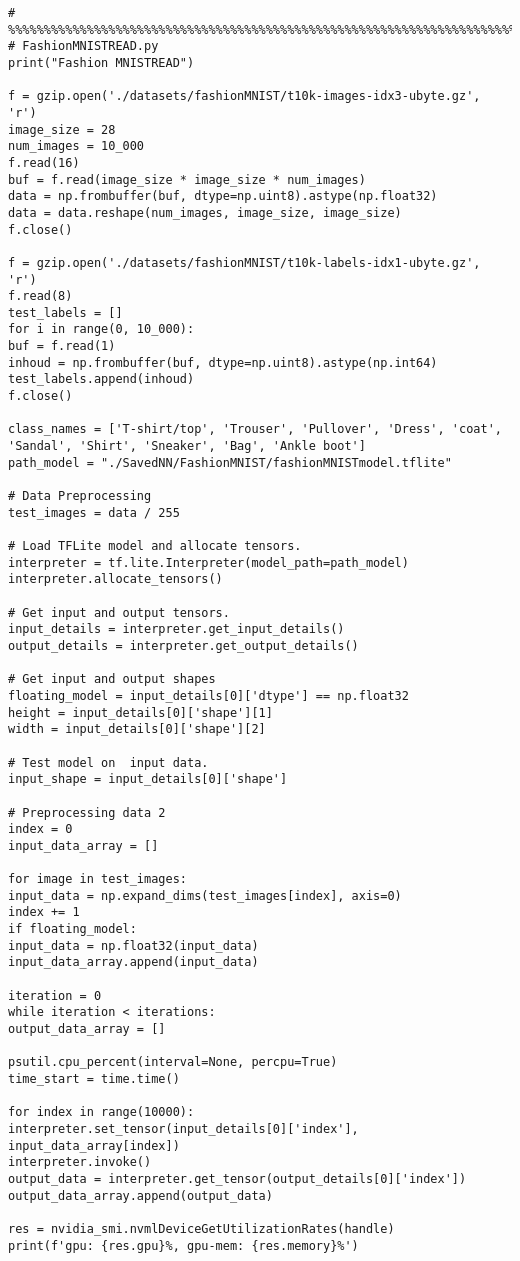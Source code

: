 \begin{lstlisting}
# %%%%%%%%%%%%%%%%%%%%%%%%%%%%%%%%%%%%%%%%%%%%%%%%%%%%%%%%%%%%%%%%%%%%%%%%%%%%%%%%%%%%%%%
# FashionMNISTREAD.py
print("Fashion MNISTREAD")

f = gzip.open('./datasets/fashionMNIST/t10k-images-idx3-ubyte.gz', 'r')
image_size = 28
num_images = 10_000
f.read(16)
buf = f.read(image_size * image_size * num_images)
data = np.frombuffer(buf, dtype=np.uint8).astype(np.float32)
data = data.reshape(num_images, image_size, image_size)
f.close()

f = gzip.open('./datasets/fashionMNIST/t10k-labels-idx1-ubyte.gz', 'r')
f.read(8)
test_labels = []
for i in range(0, 10_000):
buf = f.read(1)
inhoud = np.frombuffer(buf, dtype=np.uint8).astype(np.int64)
test_labels.append(inhoud)
f.close()

class_names = ['T-shirt/top', 'Trouser', 'Pullover', 'Dress', 'coat',
'Sandal', 'Shirt', 'Sneaker', 'Bag', 'Ankle boot']
path_model = "./SavedNN/FashionMNIST/fashionMNISTmodel.tflite"

# Data Preprocessing
test_images = data / 255

# Load TFLite model and allocate tensors.
interpreter = tf.lite.Interpreter(model_path=path_model)
interpreter.allocate_tensors()

# Get input and output tensors.
input_details = interpreter.get_input_details()
output_details = interpreter.get_output_details()

# Get input and output shapes
floating_model = input_details[0]['dtype'] == np.float32
height = input_details[0]['shape'][1]
width = input_details[0]['shape'][2]

# Test model on  input data.
input_shape = input_details[0]['shape']

# Preprocessing data 2
index = 0
input_data_array = []

for image in test_images:
input_data = np.expand_dims(test_images[index], axis=0)
index += 1
if floating_model:
input_data = np.float32(input_data)
input_data_array.append(input_data)

iteration = 0
while iteration < iterations:
output_data_array = []

psutil.cpu_percent(interval=None, percpu=True)
time_start = time.time()

for index in range(10000):
interpreter.set_tensor(input_details[0]['index'], input_data_array[index])
interpreter.invoke()
output_data = interpreter.get_tensor(output_details[0]['index'])
output_data_array.append(output_data)

res = nvidia_smi.nvmlDeviceGetUtilizationRates(handle)
print(f'gpu: {res.gpu}%, gpu-mem: {res.memory}%')


\end{lstlisting}
